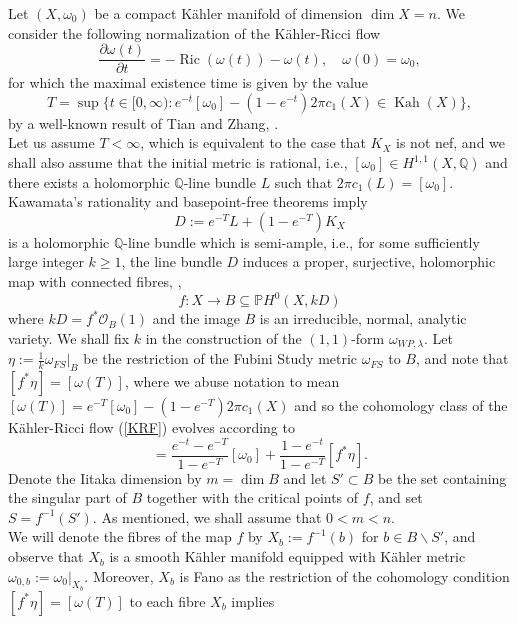 \documentclass[12pt]{article}
\numberwithin{equation}{section}
\newcommand{\Q}{\mathbb{Q}}
\renewcommand{\P}{\mathbb{P}}
\newcommand{\OO}{\mathcal{O}}
\renewcommand{\d}{\partial}
\DeclareMathOperator{\Ric}{Ric}
\DeclareMathOperator{\Kah}{Kah}
\begin{document}
Let $(X, \omega_0)$ be a compact K\"ahler manifold of dimension $\dim X = n$. We consider the following normalization of the K\"ahler-Ricci flow
\begin{equation}\label{KRF}\tag{KRF}
    \frac{\d \omega(t)}{\d t} = -\Ric (\omega(t)) - \omega(t), \quad \omega(0) = \omega_0,  
\end{equation}
for which the maximal existence time is given by the value
\begin{equation*}
    T = \sup\{t\in [0,\infty) : e^{-t}[\omega_0] - (1-e^{-t}) 2\pi c_1(X) \in \Kah(X)\},
\end{equation*}
by a well-known result of Tian and Zhang, \cite{TZ06}.\\
Let us assume $T < \infty$, which is equivalent to the case that $K_X$ is not nef, and we shall also assume that the initial metric is rational, i.e., $[\omega_0] \in H^{1,1}(X,\Q)$ and there exists a holomorphic $\Q$-line bundle $L$ such that $2\pi c_1(L) = [\omega_0]$. Kawamata's rationality and basepoint-free theorems imply
\begin{equation*}
    D := e^{-T} L + (1-e^{-T}) K_X
\end{equation*}
is a holomorphic $\Q$-line bundle which is semi-ample, i.e., for some sufficiently large integer $k \geq 1$, the line bundle $D$ induces a proper, surjective, holomorphic map with connected fibres, \cite{L04},
\begin{equation*}
    f: X \to B \subseteq \P H^0(X,kD)
\end{equation*}
where $kD = f^* \OO_B(1)$ and the image $B$ is an irreducible, normal, analytic variety. We shall fix $k$ in the construction of the $(1,1)$-form $\omega_{WP,\lambda}$. Let $\eta := \frac{1}{k} \omega_{FS}|_B$ be the restriction of the Fubini Study metric $\omega_{FS}$ to $B$, and note that $[f^*\eta] = [\omega(T)]$, where we abuse notation to mean $[\omega(T)] = e^{-T} [\omega_0] - (1-e^{-T}) 2\pi c_1(X)$ and so the cohomology class of the K\"ahler-Ricci flow (\ref{KRF}) evolves according to 
\begin{equation*}
    [\omega(t)] = \frac{e^{-t}-e^{-T}}{1-e^{-T}} [\omega_0] + \frac{1-e^{-t}}{1-e^{-T}} [f^*\eta].
\end{equation*}
Denote the Iitaka dimension by $m = \dim B$ and let $S' \subset B$ be the set containing the singular part of $B$ together with the critical points of $f$, and set $S = f^{-1}(S')$. As mentioned, we shall assume that $0 < m < n$.\\
\noindent We will denote the fibres of the map $f$ by $X_b := f^{-1}(b)$ for $b \in B \backslash S'$, and observe that $X_b$ is a smooth K\"ahler manifold equipped with K\"ahler metric $\omega_{0,b} := \omega_0|_{X_b}$. Moreover, $X_b$ is Fano as the restriction of the cohomology condition $[f^*\eta] = [\omega(T)]$ to each fibre $X_b$ implies
\end{document}
